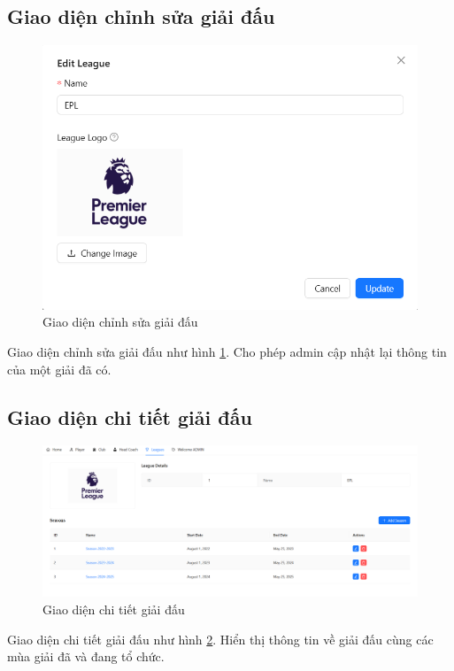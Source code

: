 \documentclass[../BTL.tex]{subfiles}
\begin{document}
\subsection{Giao diện chỉnh sửa giải đấu}
\begin{figure}
    \centering
    \includegraphics[width=1\linewidth]{Hinhve/admin_edit_leauge.png}
    \caption{Giao diện chỉnh sửa giải đấu}
    \label{fig:admin_edit_league}
\end{figure}
Giao diện chỉnh sửa giải đấu như hình \ref{fig:admin_edit_league}. Cho phép admin cập nhật lại thông tin của một giải đã có.

\subsection{Giao diện chi tiết giải đấu}
\begin{figure}
    \centering
    \includegraphics[width=1\linewidth]{Hinhve/admin_league_detail.png}
    \caption{Giao diện chi tiết giải đấu}
    \label{fig:admin_league_detail}
\end{figure}
Giao diện chi tiết giải đấu như hình \ref{fig:admin_league_detail}. Hiển thị thông tin về giải đấu cùng các mùa giải đã và đang tổ chức.
\end{document}

